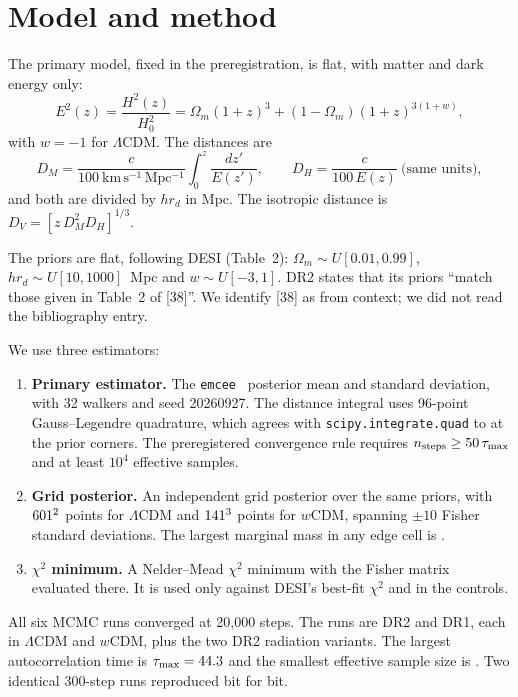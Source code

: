 \documentclass[11pt]{article}
\begin{document}
\section{Model and method}

The primary model, fixed in the preregistration, is flat, with matter and
dark energy only:
\begin{equation}
E^2(z)=\frac{H^2(z)}{H_0^2}=\Omega_m(1+z)^3+(1-\Omega_m)(1+z)^{3(1+w)},
\end{equation}
with $w=-1$ for $\Lambda$CDM. The distances are
\[
D_M=\frac{c}{100\ \mathrm{km\,s^{-1}\,Mpc^{-1}}}\int_0^z\frac{dz'}{E(z')},
\qquad
D_H=\frac{c}{100\,E(z)}\ \text{(same units)},
\]
and both are divided by $hr_d$ in Mpc. The isotropic distance is
$D_V=[z\,D_M^2D_H]^{1/3}$.

The priors are flat, following DESI \cite{desi2024vi} (Table~2):
$\Omega_m\sim U[0.01,0.99]$, $hr_d\sim U[10,1000]$~Mpc and
$w\sim U[-3,1]$. DR2 states that its priors ``match those given in Table~2
of [38]''. We identify [38] as \cite{desi2024vi} from context; we did not
read the bibliography entry.

We use three estimators:
\begin{enumerate}
\item \textbf{Primary estimator.} The \texttt{emcee}~\EmceeVersion{}
posterior mean and standard deviation, with 32 walkers and seed 20260927.
The distance integral uses 96-point Gauss--Legendre quadrature, which agrees
with \texttt{scipy.integrate.quad} to \GLdiff{} at the prior corners. The
preregistered convergence rule requires $n_{\rm steps}\ge50\,\tau_{\max}$
and at least $10^4$ effective samples.
\item \textbf{Grid posterior.} An independent grid posterior over the same
priors, with $601^2$ points for $\Lambda$CDM and $141^3$
points for $w$CDM, spanning $\pm10$ Fisher standard deviations. The largest
marginal mass in any edge cell is \GridEdgeMax.
\item \textbf{$\chi^2$ minimum.} A Nelder--Mead $\chi^2$ minimum with the
Fisher matrix evaluated there. It is used only against DESI's best-fit
$\chi^2$ and in the controls.
\end{enumerate}

All six MCMC runs converged at 20{,}000 steps. The runs are DR2 and DR1, each
in $\Lambda$CDM and $w$CDM, plus the two DR2 radiation variants. The largest
autocorrelation time is $\tau_{\max}=44.3$ and the smallest effective
sample size is \EssMin. Two identical 300-step runs reproduced bit for bit.
\end{document}
